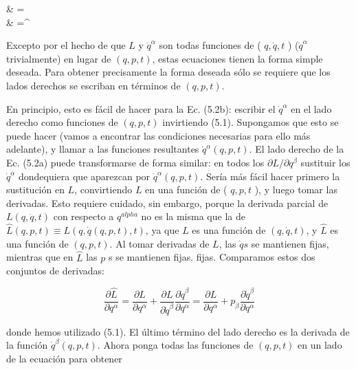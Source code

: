 \begin{DispWithArrows}[format=ll, displaystyle]
   & =  \\
   & =^{\alpha} 
\end{DispWithArrows}

Excepto por el hecho de que $L$ y $\dot{q}^{\alpha}$ son todas funciones de ( $q, \dot{q}, t$ ) ($\dot{q}^{\alpha}$ trivialmente) en lugar de $(q, p, t)$, estas ecuaciones tienen la forma simple deseada. Para obtener precisamente la forma deseada sólo se requiere que los lados derechos se escriban en términos de $(q, p, t)$.

En principio, esto es fácil de hacer para la Ec. (5.2b): escribir el $\dot{q}^{\alpha}$ en el lado derecho como funciones de $(q, p, t)$ invirtiendo (5.1). Supongamos que esto se puede hacer (vamos a encontrar las condiciones necesarias para ello más adelante), y llamar a las funciones resultantes $\dot{q}^{\alpha}(q, p, t)$. El lado derecho de la Ec. (5.2a) puede transformarse de forma similar: en todos los $\partial L / \partial q^{\beta}$ sustituir los $\dot{q}^{\alpha}$ dondequiera que aparezcan por $\dot{q}^{\alpha}(q, p, t)$. Sería más fácil hacer primero la sustitución en $L$, convirtiendo $L$ en una función de ( $q, p, t$ ), y luego tomar las derivadas. Esto requiere cuidado, sin embargo, porque la derivada parcial de $L(q, \dot{q}, t)$ con respecto a $q^{alpha}$ no es la misma que la de  $\hat{L}(q, p, t) \equiv L(q, \dot{q}(q, p, t), t)$, ya que $L$ es una función de $(q, \dot{q}, t)$, y $\hat{L}$ es una función de $(q, p, t)$. Al tomar derivadas de $L$, las $\dot{q} s$ se mantienen fijas, mientras que en $\hat{L}$ las $p$ s se mantienen fijas.
fijas. Comparamos estos dos conjuntos de derivadas:

\[\frac{\partial \hat{L}}{\partial q^{\alpha}}=\frac{\partial L}{\partial q^{\alpha}}+\frac{\partial L}{\partial \dot{q}^{\beta}} \frac{\partial \dot{q}^{\beta}}{\partial q^{\alpha}}=\frac{\partial L}{\partial q^{\alpha}}+p_{\beta} \frac{\partial \dot{q}^{\beta}}{\partial q^{\alpha}}\]

donde hemos utilizado (5.1). El último término del lado derecho es la derivada de la función $\dot{q}^{\beta}(q, p, t)$. Ahora ponga todas las funciones de $(q, p, t)$ en un lado de la ecuación para obtener

